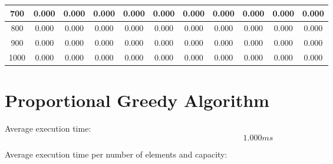 \documentclass[11pt]{article}
\begin{document}
\begin{table}[h!]
\begin{tabular}{c|cccccccccc|}
\multicolumn{1}{|c|}{700} & \multicolumn{1}{c|}{0.000} & \multicolumn{1}{c|}{0.000} & \multicolumn{1}{c|}{0.000} & \multicolumn{1}{c|}{0.000} & \multicolumn{1}{c|}{0.000} & \multicolumn{1}{c|}{0.000} & \multicolumn{1}{c|}{0.000} & \multicolumn{1}{c|}{0.000} & \multicolumn{1}{c|}{0.000}  & 0.000 \\ \hline
\multicolumn{1}{|c|}{800} & \multicolumn{1}{c|}{0.000} & \multicolumn{1}{c|}{0.000} & \multicolumn{1}{c|}{0.000} & \multicolumn{1}{c|}{0.000} & \multicolumn{1}{c|}{0.000} & \multicolumn{1}{c|}{0.000} & \multicolumn{1}{c|}{0.000} & \multicolumn{1}{c|}{0.000} & \multicolumn{1}{c|}{0.000}  & 0.000 \\ \hline
\multicolumn{1}{|c|}{900} & \multicolumn{1}{c|}{0.000} & \multicolumn{1}{c|}{0.000} & \multicolumn{1}{c|}{0.000} & \multicolumn{1}{c|}{0.000} & \multicolumn{1}{c|}{0.000} & \multicolumn{1}{c|}{0.000} & \multicolumn{1}{c|}{0.000} & \multicolumn{1}{c|}{0.000} & \multicolumn{1}{c|}{0.000}  & 0.000 \\ \hline
\multicolumn{1}{|c|}{1000} & \multicolumn{1}{c|}{0.000} & \multicolumn{1}{c|}{0.000} & \multicolumn{1}{c|}{0.000} & \multicolumn{1}{c|}{0.000} & \multicolumn{1}{c|}{0.000} & \multicolumn{1}{c|}{0.000} & \multicolumn{1}{c|}{0.000} & \multicolumn{1}{c|}{0.000} & \multicolumn{1}{c|}{0.000}  & 0.000 \\ \hline
\end{tabular}
\end{table}

\newpage

\section{Proportional Greedy Algorithm}

Average execution time:
\[1.000 ms\]

Average execution time per number of elements and capacity:
\end{document}
